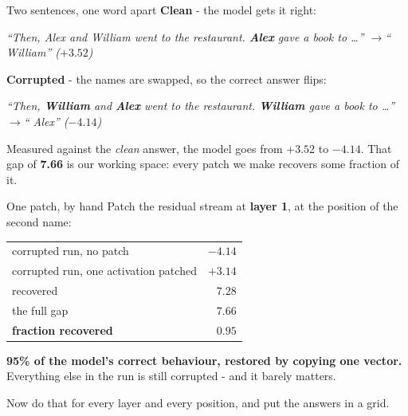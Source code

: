 \documentclass[aspectratio=169]{beamer}
\newcommand{\keybox}[1]{%
  \begin{tcolorbox}[colback=armblue!8, colframe=armblue, boxrule=0.6pt, arc=2pt]
  #1
  \end{tcolorbox}}
\newcommand{\takebox}[1]{%
  \begin{tcolorbox}[colback=paramgreen!8, colframe=paramgreen, boxrule=0.6pt, arc=2pt]
  #1
  \end{tcolorbox}}
\newcommand{\promptbox}[1]{%
  \begin{center}
  \begin{tcolorbox}[colback=lightbg, colframe=gray, boxrule=0.5pt, arc=2pt, width=0.88\textwidth]
    \centering\textit{#1}
  \end{tcolorbox}
  \end{center}}
\begin{document}
\begin{frame}{Two sentences, one word apart}
  \vspace{0.5em}
  \textbf{Clean} - the model gets it right:
  \promptbox{``Then, Alex and William went to the restaurant. \textcolor{armblue}{\textbf{Alex}}
  gave a book to \ldots'' \quad$\rightarrow$\quad `` William'' \quad ($+3.52$)}

  \vspace{0.2em}
  \textbf{Corrupted} - the names are swapped, so the correct answer flips:
  \promptbox{``Then, \textcolor{armred}{\textbf{William}} and
  \textcolor{armred}{\textbf{Alex}} went to the restaurant. \textcolor{armred}{\textbf{William}}
  gave a book to \ldots'' \quad$\rightarrow$\quad `` Alex'' \quad ($-4.14$)}

  \vspace{0.5em}
  \keybox{Measured against the \emph{clean} answer, the model goes from $+3.52$ to $-4.14$. That
  gap of \textbf{7.66} is our working space: every patch we make recovers some fraction of it.}
\end{frame}

\begin{frame}{One patch, by hand}
  \vspace{0.7em}
  Patch the residual stream at \textbf{layer 1}, at the position of the second name:

  \vspace{0.7em}
  \begin{center}
  \small
  \begin{tabular}{@{}lr@{}}
    \toprule
    corrupted run, no patch & $-4.14$\\
    corrupted run, one activation patched & $+3.14$\\
    \midrule
    recovered & $7.28$\\
    the full gap & $7.66$\\
    \midrule
    \textbf{fraction recovered} & $\mathbf{0.95}$\\
    \bottomrule
  \end{tabular}
  \end{center}

  \vspace{0.9em}
  \takebox{\textbf{95\% of the model's correct behaviour, restored by copying one vector.}
  Everything else in the run is still corrupted - and it barely matters.}

  \vspace{0.6em}
  Now do that for every layer and every position, and put the answers in a grid.
\end{frame}
\end{document}
